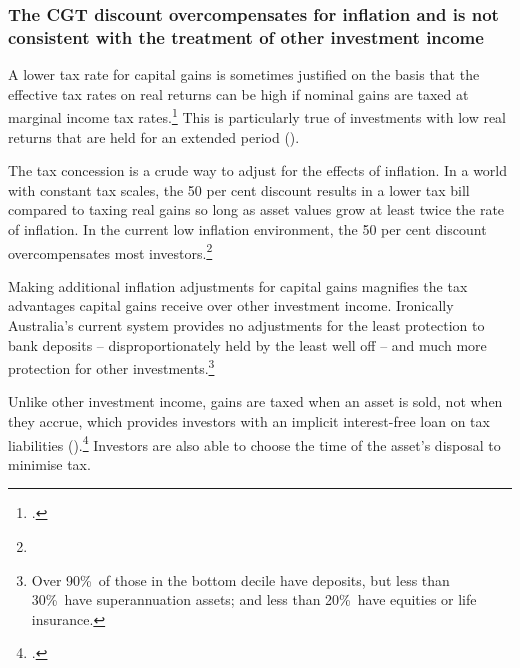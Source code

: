 \documentclass{grattan}\usepackage[]{graphicx}\usepackage[]{color}
\begin{document}
\subsubsection{The CGT discount overcompensates for inflation and is not consistent with the treatment of other investment income}
A lower tax rate for capital gains is sometimes justified on the basis that the effective tax rates on real returns can be high if nominal gains are taxed at marginal income tax rates.\footcite{Treasury2010} This is particularly true of investments with low real returns that are held for an extended period ().

The tax concession is a crude way to adjust for the effects of inflation. In a world with constant tax scales, the 50 per cent discount results in a lower tax bill compared to taxing real gains so long as asset values grow at least twice the rate of inflation. In the current low inflation environment, the 50 per cent discount overcompensates most investors.\footnote{}

Making additional inflation adjustments for capital gains magnifies the tax advantages capital gains receive over other investment income. Ironically Australia's current system provides no adjustments for the least protection to bank deposits -- disproportionately held by the least well off -- and much more protection for other investments.\footnote{Over 90\%\ of those in the bottom decile have deposits, but less than 30\%\ have superannuation assets; and less than 20\%\ have equities or life insurance.}

Unlike other investment income, gains are taxed when an asset is sold, not when they accrue, which provides investors with an implicit interest-free loan on tax liabilities ().\footcites[See also:][p.~2]{Fane2004}[p.~12]{Ingles2009} Investors are also able to choose the time of the asset's disposal to minimise tax. 
\end{document}
